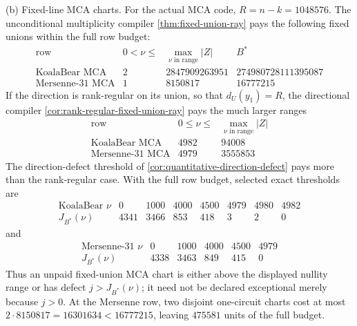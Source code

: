 \documentclass[11pt,a4paper]{amsart}
\numberwithin{equation}{section}
\theoremstyle{remark}
\begin{document}
\begin{proposition}
\textup{(b) Fixed-line MCA charts.}
For the actual MCA code, \(R=n-k=1048576\).  The unconditional
multiplicity compiler \cref{thm:fixed-union-ray} pays the following fixed
unions within the full row budget:
\[
\begin{array}{c|r|r|r}
\text{row}&0<\nu\le&
 \max\limits_{\nu\text{ in range}}|Z|&B^*\\ \hline
\text{KoalaBear MCA}&2&2847909263951&274980728111395087\\
\text{Mersenne-31 MCA}&1&8150817&16777215
\end{array}
\tag{FU-MCA}\label{eq:active-fixed-union-mca}
\]
If the direction is rank-regular on its union, so that
\(d_U(y_1)=R\), the directional compiler
\cref{cor:rank-regular-fixed-union-ray} pays the much larger ranges
\[
\begin{array}{c|r|r}
\text{row}&0\le\nu\le&
 \max\limits_{\nu\text{ in range}}|Z|\\ \hline
\text{KoalaBear MCA}&4982&94008\\
\text{Mersenne-31 MCA}&4979&3555853
\end{array}
\tag{FU-MCA-reg}\label{eq:active-rank-regular-mca}
\]
The direction-defect threshold of
\cref{cor:quantitative-direction-defect} pays more than the rank-regular
case.  With the full row budget, selected exact thresholds are
\[
\begin{array}{c|rrrrrrr}
\text{KoalaBear }\nu&0&1000&4000&4500&4979&4980&4982\\ \hline
J_{B^*}(\nu)&4341&3466&853&418&3&2&0
\end{array}
\tag{FU-KB-def}\label{eq:active-kb-direction-defect}
\]
and
\[
\begin{array}{c|rrrrr}
\text{Mersenne-31 }\nu&0&1000&4000&4500&4979\\ \hline
J_{B^*}(\nu)&4338&3463&849&415&0
\end{array}
\tag{FU-M31-def}\label{eq:active-m31-direction-defect}
\]
Thus an unpaid fixed-union MCA chart is either above the displayed
nullity range or has defect \(j>J_{B^*}(\nu)\); it need not be declared
exceptional merely because \(j>0\).  At the Mersenne row, two disjoint
one-circuit charts cost at most
\(2\cdot8150817=16301634<16777215\), leaving \(475581\) units of the
full budget.
\end{proposition}
\end{document}
